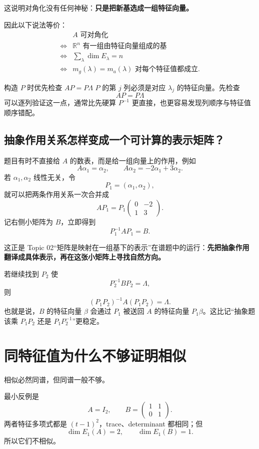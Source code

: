 \documentclass[11pt,a4paper]{ctexart}
\newcommand{\kw}[1]{\textbf{\color{deep}#1}}
\begin{document}
这说明对角化没有任何神秘：\kw{只是把新基选成一组特征向量。}

因此以下说法等价：
\[
\boxed{
\begin{aligned}
&A\text{ 可对角化}\\
\Longleftrightarrow{}&\mathbb R^n\text{ 有一组由特征向量组成的基}\\
\Longleftrightarrow{}&\sum_{\lambda}\dim E_\lambda=n\\
\Longleftrightarrow{}&m_g(\lambda)=m_a(\lambda)\text{ 对每个特征值都成立}.
\end{aligned}}
\]

\begin{methodbox}{构造 $P$ 时优先检查 $AP=P\Lambda$}
$P$ 的第 $j$ 列必须是对应 $\lambda_j$ 的特征向量。先检查
\[
AP=P\Lambda
\]
可以逐列验证这一点，通常比先硬算 $P^{-1}$ 更直接，也更容易发现列顺序与特征值顺序错配。
\end{methodbox}

\subsection{抽象作用关系怎样变成一个可计算的表示矩阵？}

题目有时不直接给 $A$ 的数表，而是给一组向量上的作用，例如
\[
A\alpha_1=\alpha_2,
\qquad
A\alpha_2=-2\alpha_1+3\alpha_2.
\]
若 $\alpha_1,\alpha_2$ 线性无关，令
\[
P_1=(\alpha_1,\alpha_2),
\]
就可以把两条作用关系一次合并成
\[
A P_1=P_1
\begin{pmatrix}
0&-2\\
1&3
\end{pmatrix}.
\]
记右侧小矩阵为 $B$，立即得到
\[
\boxed{P_1^{-1}AP_1=B.}
\]

这正是 Topic 02“矩阵是映射在一组基下的表示”在谱题中的运行：\kw{先把抽象作用翻译成具体表示，再在这张小矩阵上寻找自然方向。}

若继续找到 $P_2$ 使
\[
P_2^{-1}BP_2=\Lambda,
\]
则
\[
\boxed{(P_1P_2)^{-1}A(P_1P_2)=\Lambda.}
\]
也就是说，$B$ 的特征向量 $\beta$ 会通过 $P_1$ 被送回 $A$ 的特征向量 $P_1\beta$。这比记“抽象题该乘 $P_1P_2$ 还是 $P_1P_2^{-1}$”更稳定。

\section{同特征值为什么不够证明相似}

相似必然同谱，但同谱一般不够。

最小反例是
\[
A=I_2,
\qquad
B=\begin{pmatrix}1&1\\0&1\end{pmatrix}.
\]
两者特征多项式都是 $(t-1)^2$，trace、determinant 都相同；但
\[
\dim E_1(A)=2,
\qquad
\dim E_1(B)=1.
\]
所以它们不相似。
\end{document}
